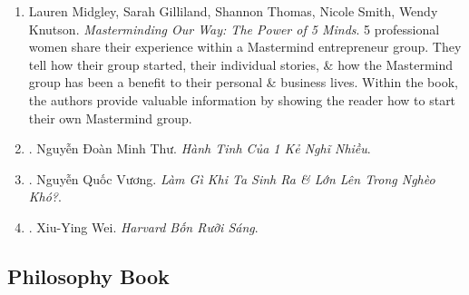 \documentclass{article}
\begin{document}
\begin{enumerate}
	\item {\sc Lauren Midgley, Sarah Gilliland, Shannon Thomas, Nicole Smith, Wendy Knutson}. {\it Masterminding Our Way: The Power of 5 Minds}. 5 professional women share their experience within a Mastermind entrepreneur group. They tell how their group started, their individual stories, \& how the Mastermind group has been a benefit to their personal \& business lives. Within the book, the authors provide valuable information by showing the reader how to start their own Mastermind group. {}
	
	\item \cite{Thu_overthink}. {\sc Nguyễn Đoàn Minh Thư}. {\it Hành Tinh Của 1  Kẻ Nghĩ Nhiều}.\hfill{\sf[done]}
	
	\item \cite{Vuong_born_poor}. {\sc Nguyễn Quốc Vương}. {\it Làm Gì Khi Ta Sinh Ra \& Lớn Lên Trong Nghèo Khó?}.\hfill{\sf[done]}
	
	\item \cite{Wei_Harvard_VN}. {\sc Xiu-Ying Wei}. {\it Harvard Bốn Rưỡi Sáng}.\hfill{\sf[done]}
\end{enumerate}


\subsection{Philosophy Book}
\end{document}
